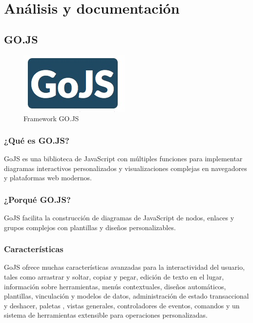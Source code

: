 \documentclass[a4paper,12pt]{article}
\newcounter{ns}
\begin{document}
	\afterpage{\null\newpage}
	\newpage
	
	 \section{Análisis y documentación}
	 
	 	\subsection{GO.JS}
	 		
	 		
	 		\begin{figure}[h]
	 			\centering
	 			\includegraphics[scale=1]{gojs.jpeg}
	 			\caption{Framework GO.JS}
	 		\end{figure}
	 	
	 	
	 		\subsubsection{¿Qué es GO.JS?}
	 			GoJS es una biblioteca de JavaScript con múltiples funciones para implementar diagramas interactivos personalizados y visualizaciones complejas en navegadores y plataformas web modernos.
	 	
	 		\subsubsection{¿Porqué GO.JS?}
	 		 GoJS facilita la construcción de diagramas de JavaScript de nodos, enlaces y grupos complejos con plantillas y diseños personalizables.
	 		
	 		
	 		\subsubsection{Características}
	 		GoJS ofrece muchas características avanzadas para la interactividad del usuario, tales como arrastrar y soltar, copiar y pegar, edición de texto en el lugar, información sobre herramientas, menús contextuales, diseños automáticos, plantillas, vinculación y modelos de datos, administración de estado transaccional y deshacer, paletas , vistas generales, controladores de eventos, comandos y un sistema de herramientas extensible para operaciones personalizadas.
	 		
\end{document}
